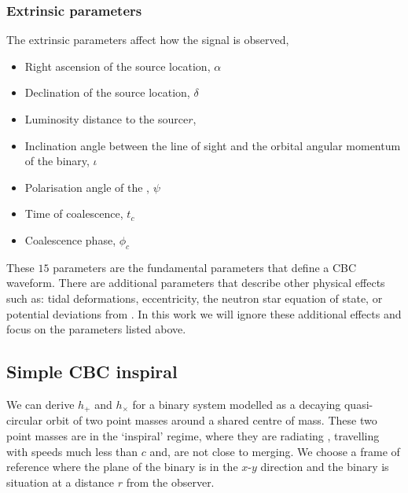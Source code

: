 \subsubsection{Extrinsic parameters}
The extrinsic parameters affect how the \gwadj signal is observed,
\begin{itemize}
   \item Right ascension of the source location, $\alpha$ 
   \item Declination of the source location, $\delta$
   \item Luminosity distance to the source$r$, 
   \item Inclination angle between the line of sight and the orbital angular momentum of the binary, $\iota$
   \item Polarisation angle of the \gw, $\psi$
   \item Time of coalescence, $t_{c}$
   \item Coalescence phase, $\phi_{c}$ 
\end{itemize}

These $15$ parameters are the fundamental parameters that define a CBC waveform. There are additional parameters that describe other physical effects such as: tidal deformations, eccentricity, the neutron star equation of state, or potential deviations from \GR. In this work we will ignore these additional effects and focus on the parameters listed above.

\subsection{\label{1:sec:keplerian_derivation}Simple CBC inspiral}

We can derive $h_{+}$ and $h_{\times}$ for a binary system modelled as a decaying quasi-circular orbit of two point masses around a shared centre of mass. These two point masses are in the `inspiral' regime, where they are radiating \gws, travelling with speeds much less than $c$ and, are not close to merging. We choose a frame of reference where the plane of the binary is in the $x$-$y$ direction and the binary is situation at a distance $r$ from the observer.

